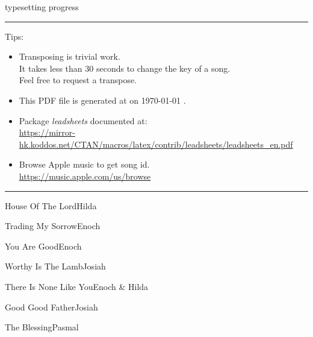 \documentclass{article}
\begin{document}


\par
{\ttfamily typesetting progress} \par
\bigskip

\label{lbtoc}
\newcommand{\cursec}[0]{}
\tableofcontents
\bigskip
\hrule
\bigskip
Tips:
\begin{itemize}
  \item Transposing is trivial work. \\ It takes less than 30 seconds to change the key of a song. \\ Feel free to request a transpose.
  \item This PDF file is generated at \textbraceleft{} \currenttime{} \textbraceright{} on \textbraceleft{} \today{} \textbraceright{}.
  \item Package \textit{leadsheets} documented at: \\ \url{https://mirror-hk.koddos.net/CTAN/macros/latex/contrib/leadsheets/leadsheets_en.pdf}
  \item Browse Apple music to get song id. \\ \url{https://music.apple.com/us/browse}
\end{itemize}
\hrule
\pagebreak

{}{}{}{}{House Of The Lord}{}{Hilda}{}

{}{}{}{}{Trading My Sorrow}{}{Enoch}{}

{}{}{}{}{You Are Good}{}{Enoch}{}



{}{}{}{}{Worthy Is The Lamb}{}{Josiah}{}

{}{}{}{}{There Is None Like You}{}{Enoch \& Hilda}{}


{}{}{}{}{Good Good Father}{}{Josiah}{}

{}{}{}{}{The Blessing}{}{Pasmal}{}
\end{document}
